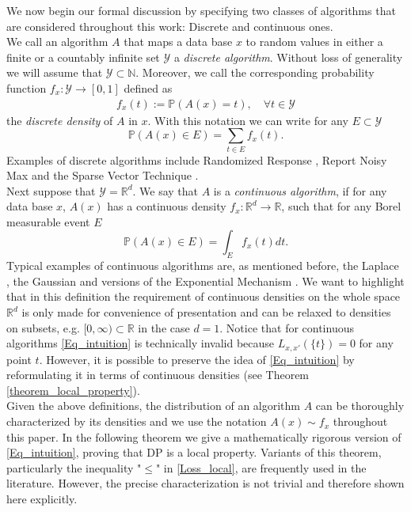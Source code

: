 \documentclass[conference]{IEEEtran}
\begin{document}
We now begin our formal discussion by specifying two classes of algorithms that are considered throughout this work: Discrete and continuous ones. \\
We call an algorithm $A$ that maps a data base $x$ to random values in either a finite or a countably infinite set $ \mathcal{Y}$ a \textit{discrete algorithm}. Without loss of generality we will assume that $\mathcal{Y} \subset \mathbb{N}$. Moreover, we call the corresponding  probability function $f_x: \mathcal{Y} \to [0,1]$ defined as
\begin{align}
f_x(t) := \mathbb{P}(A(x) =t), \quad \forall t \in \mathcal{Y}  \label{Def_discrete_density}
\end{align}
the \textit{discrete density} of $A$ in $x$. With this notation we can write for any $E \subset \mathcal{Y}$
\begin{equation} \label{Eq_def_discr_dens}
\mathbb{P}(A(x) \in E) = \sum_{t \in E}f_x(t).
\end{equation}
Examples of discrete algorithms include Randomized Response \cite{Kairouz2016}, Report Noisy Max \cite{Dwork2014} and the Sparse Vector Technique \cite{Lyu2017}.\\
Next suppose that $\mathcal{Y} = \mathbb{R}^d$. We say that $A$ is a \textit{continuous algorithm}, if for any data base $x$, $A(x)$ has a continuous density $f_x: \mathbb{R}^{d} \to \mathbb{R}$, such that for any Borel measurable event $E$ 
$$
\mathbb{P}(A(x) \in E) = \int_E f_x(t) dt.
$$
Typical examples of continuous algorithms are, as mentioned before, the Laplace \cite{Dwork2014}, the Gaussian \cite{Dwork2014} and versions of the Exponential Mechanism \cite{Talwar2007}.
We want to highlight that in this definition the requirement of continuous densities on the whole space $\mathbb{R}^d$ is only made for convenience of presentation and can be relaxed to densities on subsets, e.g. $[0, \infty) \subset \mathbb{R}$ in the case $d=1$. 
Notice that for continuous algorithms \eqref{Eq_intuition} is technically invalid because $L_{x,x'}(\{t\})=0$ for any point $t$.  However, it is possible to preserve the idea of \eqref{Eq_intuition} by reformulating it in terms of continuous densities (see Theorem \ref{theorem_local_property}).\\


Given the above definitions, the distribution of an algorithm $A$ can be thoroughly characterized by its densities and we use the notation  $A(x) \sim f_x$
throughout this paper.  In the following theorem we give a mathematically rigorous  version of \eqref{Eq_intuition},  proving that DP is a local property. Variants of this theorem, particularly the inequality "$\le$" in \eqref{Loss_local}, are frequently used in the literature. However, the precise characterization is not trivial and therefore shown here explicitly.
\end{document}
